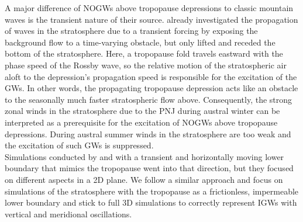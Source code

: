 A major difference of NOGWs above tropopause depressions to classic mountain waves is the transient nature of their source. \textcite{pfister_gravity_1993} already investigated the propagation of waves in the stratosphere due to a transient forcing by exposing the background flow to a time-varying obstacle, but only lifted and receded the bottom of the stratosphere. Here, a tropopause fold travels eastward with the phase speed of the Rossby wave, so the relative motion of the stratospheric air aloft to the depression's propagation speed is responsible for the excitation of the GWs. In other words, the propagating tropopause depression acts like an obstacle to the seasonally much faster stratospheric flow above. Consequently, the strong zonal winds in the stratosphere due to the PNJ during austral winter can be interpreted as a prerequisite for the excitation of NOGWs above tropopause depressions. During austral summer winds in the stratosphere are too weak and the excitation of such GWs is suppressed. \\
Simulations conducted by \textcite[]{prusa_propagation_1996} and \textcite[]{prusa_all-scale_2003} with a transient and horizontally moving lower boundary that mimics the tropopause went into that direction, but they focused on different aspects in a 2D plane. We follow a similar approach and focus on simulations of the stratosphere with the tropopause as a frictionless, impermeable lower boundary and stick to full 3D simulations to correctly represent IGWs with vertical and meridional oscillations. 

